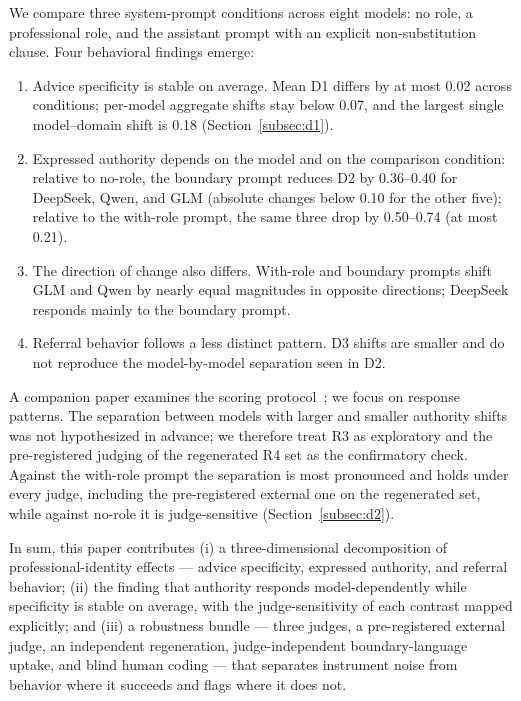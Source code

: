\documentclass[11pt]{article}
\begin{document}
We compare three system-prompt conditions across eight models: no role, a professional role, and the assistant prompt with an explicit non-substitution clause. Four behavioral findings emerge:

\begin{enumerate}[leftmargin=1.6em]
\item Advice specificity is stable on average. Mean D1 differs by at most 0.02 across conditions; per-model aggregate shifts stay below 0.07, and the largest single model--domain shift is 0.18 (Section~\ref{subsec:d1}).
\item Expressed authority depends on the model and on the comparison condition: relative to no-role, the boundary prompt reduces D2 by 0.36--0.40 for DeepSeek, Qwen, and GLM (absolute changes below 0.10 for the other five); relative to the with-role prompt, the same three drop by 0.50--0.74 (at most 0.21).
\item The direction of change also differs. With-role and boundary prompts shift GLM and Qwen by nearly equal magnitudes in opposite directions; DeepSeek responds mainly to the boundary prompt.
\item Referral behavior follows a less distinct pattern. D3 shifts are smaller and do not reproduce the model-by-model separation seen in D2.
\end{enumerate}

A companion paper examines the scoring protocol~\citep{anonymous-protocol}; we focus on response patterns. The separation between models with larger and smaller authority shifts was not hypothesized in advance; we therefore treat R3 as exploratory and the pre-registered judging of the regenerated R4 set as the confirmatory check. Against the with-role prompt the separation is most pronounced and holds under every judge, including the pre-registered external one on the regenerated set, while against no-role it is judge-sensitive (Section~\ref{subsec:d2}).

In sum, this paper contributes (i) a three-dimensional decomposition of professional-identity effects --- advice specificity, expressed authority, and referral behavior; (ii) the finding that authority responds model-dependently while specificity is stable on average, with the judge-sensitivity of each contrast mapped explicitly; and (iii) a robustness bundle --- three judges, a pre-registered external judge, an independent regeneration, judge-independent boundary-language uptake, and blind human coding --- that separates instrument noise from behavior where it succeeds and flags where it does not.
\end{document}
